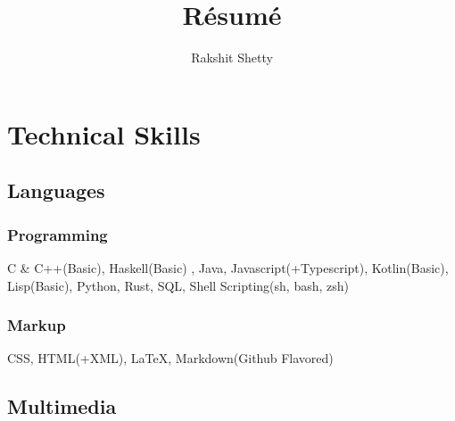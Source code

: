 \documentclass{article}
\renewcommand{\maketitle} {
	\begin{center}
	{\huge\bfseries\theauthor}
	\vspace{.25em}
	\end{center}

}
\begin{document}
	\title{R\'esum\'e}
	\author{Rakshit Shetty}

	\maketitle

	\section{Technical Skills}
		\subsection{Languages}
			\subsubsection{Programming}
				 	C \& C++(Basic), Haskell(Basic) , Java, Javascript(+Typescript), Kotlin(Basic), Lisp(Basic), Python, Rust, SQL, Shell Scripting(sh, bash, zsh)
			\subsubsection{Markup}
				 	CSS, HTML(+XML), {\LaTeX}, Markdown(Github Flavored)
		\subsection{Multimedia}
\end{document}
